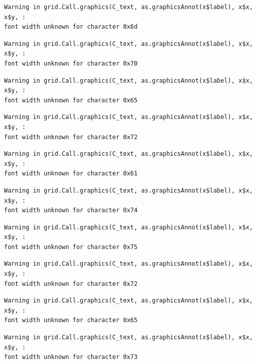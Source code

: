 \documentclass[
  letterpaper,
  DIV=11,
  numbers=noendperiod]{scrreprt}
\begin{document}
\begin{verbatim}
Warning in grid.Call.graphics(C_text, as.graphicsAnnot(x$label), x$x, x$y, :
font width unknown for character 0x6d
\end{verbatim}

\begin{verbatim}
Warning in grid.Call.graphics(C_text, as.graphicsAnnot(x$label), x$x, x$y, :
font width unknown for character 0x70
\end{verbatim}

\begin{verbatim}
Warning in grid.Call.graphics(C_text, as.graphicsAnnot(x$label), x$x, x$y, :
font width unknown for character 0x65
\end{verbatim}

\begin{verbatim}
Warning in grid.Call.graphics(C_text, as.graphicsAnnot(x$label), x$x, x$y, :
font width unknown for character 0x72
\end{verbatim}

\begin{verbatim}
Warning in grid.Call.graphics(C_text, as.graphicsAnnot(x$label), x$x, x$y, :
font width unknown for character 0x61
\end{verbatim}

\begin{verbatim}
Warning in grid.Call.graphics(C_text, as.graphicsAnnot(x$label), x$x, x$y, :
font width unknown for character 0x74
\end{verbatim}

\begin{verbatim}
Warning in grid.Call.graphics(C_text, as.graphicsAnnot(x$label), x$x, x$y, :
font width unknown for character 0x75
\end{verbatim}

\begin{verbatim}
Warning in grid.Call.graphics(C_text, as.graphicsAnnot(x$label), x$x, x$y, :
font width unknown for character 0x72
\end{verbatim}

\begin{verbatim}
Warning in grid.Call.graphics(C_text, as.graphicsAnnot(x$label), x$x, x$y, :
font width unknown for character 0x65
\end{verbatim}

\begin{verbatim}
Warning in grid.Call.graphics(C_text, as.graphicsAnnot(x$label), x$x, x$y, :
font width unknown for character 0x73
\end{verbatim}
\end{document}
